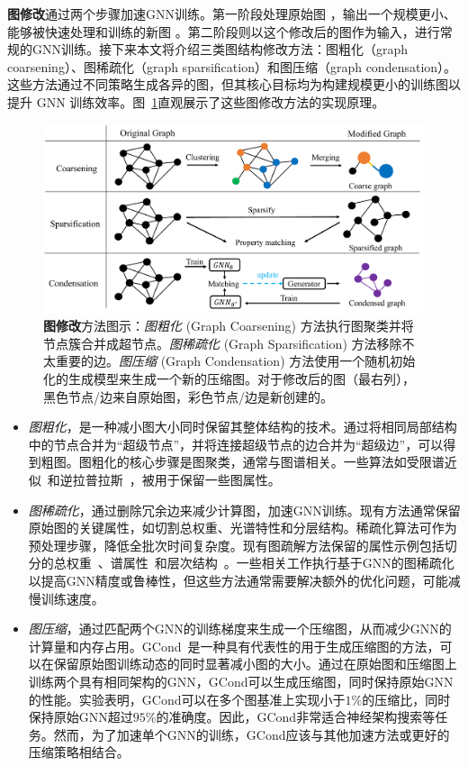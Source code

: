 \textbf{图修改}通过两个步骤加速GNN训练。第一阶段处理原始图 ，输出一个规模更小、能够被快速处理和训练的新图 。第二阶段则以这个修改后的图作为输入，进行常规的GNN训练。接下来本文将介绍三类图结构修改方法：图粗化（graph coarsening）、图稀疏化（graph sparsification）和图压缩（graph condensation）。这些方法通过不同策略生成各异的图，但其核心目标均为构建规模更小的训练图以提升 GNN 训练效率。图~\ref{figure:modification}直观展示了这些图修改方法的实现原理。
\begin{figure}[htbp]
    \begin{center}
    \includegraphics[width=\textwidth]{images/modification.pdf}
    \end{center}
    \caption{\textbf{图修改}方法图示：\textit{图粗化} (Graph Coarsening) 方法执行图聚类并将节点簇合并成超节点。\textit{图稀疏化} (Graph Sparsification) 方法移除不太重要的边。\textit{图压缩} (Graph Condensation) 方法使用一个随机初始化的生成模型来生成一个新的压缩图。对于修改后的图（最右列），黑色节点/边来自原始图，彩色节点/边是新创建的。}
    \label{figure:modification}
    \end{figure}
\begin{itemize}
    \item \textit{图粗化}，是一种减小图大小同时保留其整体结构的技术。通过将相同局部结构中的节点合并为“超级节点”，并将连接超级节点的边合并为“超级边”，可以得到粗图。图粗化的核心步骤是图聚类，通常与图谱相关。一些算法如受限谱近似~\cite{loukas_coarsening2018}和逆拉普拉斯~\cite{bravo2019unifying}，被用于保留一些图属性。
    \item \textit{图稀疏化}，通过删除冗余边来减少计算图，加速GNN训练。现有方法通常保留原始图的关键属性，如切割总权重、光谱特性和分层结构。稀疏化算法可作为预处理步骤，降低全批次时间复杂度。现有图疏解方法保留的属性示例包括切分的总权重~\cite{benczur1996approximating}、谱属性~\cite{spielman2011graph,spielman2014nearly}和层次结构~\cite{serrano2009extracting}。一些相关工作执行基于GNN的图稀疏化以提高GNN精度或鲁棒性，但这些方法通常需要解决额外的优化问题，可能减慢训练速度。
    \item \textit{图压缩}，通过匹配两个GNN的训练梯度来生成一个压缩图，从而减少GNN的计算量和内存占用。GCond~\cite{jin2021graph}是一种具有代表性的用于生成压缩图的方法，可以在保留原始图训练动态的同时显著减小图的大小。通过在原始图和压缩图上训练两个具有相同架构的GNN，GCond可以生成压缩图，同时保持原始GNN的性能。实验表明，GCond可以在多个图基准上实现小于$1\%$的压缩比，同时保持原始GNN超过$95\%$的准确度。因此，GCond非常适合神经架构搜索等任务。然而，为了加速单个GNN的训练，GCond应该与其他加速方法或更好的压缩策略相结合。
\end{itemize}

